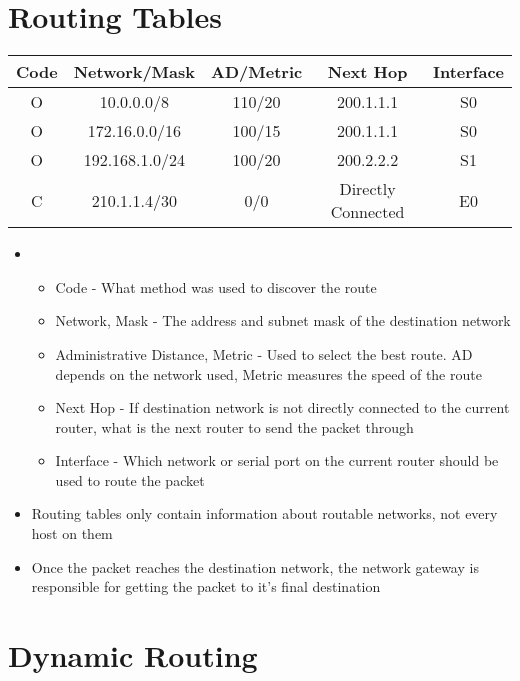 \section*{Routing Tables}

\begin{tabular}{ |c|c|c|c|c| }
  \hline Code & Network/Mask & AD/Metric & Next Hop & Interface \\
  \hline O & 10.0.0.0/8 & 110/20 & 200.1.1.1 & S0 \\
  O & 172.16.0.0/16 & 100/15 & 200.1.1.1 & S0 \\
  O & 192.168.1.0/24 & 100/20 & 200.2.2.2 & S1 \\
  C & 210.1.1.4/30 & 0/0 & Directly Connected & E0 \\
  \hline
\end{tabular}
\begin{itemize}
  \item 
  \begin{itemize}
    \item Code - What method was used to discover the route
    \item Network, Mask - The address and subnet mask of the destination network
    \item Administrative Distance, Metric - Used to select the best route. AD depends on the network used, Metric measures the speed of the route
    \item Next Hop - If destination network is not directly connected to the current router, what is the next router to send the packet through
    \item Interface - Which network or serial port on the current router should be used to route the packet
  \end{itemize}
  \item Routing tables only contain information about routable networks, not every host on them
  \item Once the packet reaches the destination network, the network gateway is responsible for getting the packet to it's final destination
\end{itemize}

\section*{Dynamic Routing}

